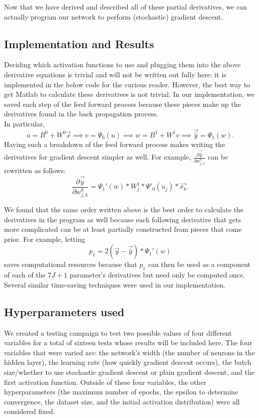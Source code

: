 \documentclass[reqno,14pt]{amsart}
\theoremstyle{plain}
\theoremstyle{definition}
\theoremstyle{remark}
\begin{document}
Now that we have derived and described all of these partial derivatives, we can actually program our network to perform (stochastic) gradient descent.\\

\subsection{Implementation and Results}
Deciding which activation functions to use and plugging them into the above derivative equations is trivial and will not be written out fully here: it is implemented in the below code for the curious reader. However, the best way to get Matlab to calculate these derivatives is not trivial. In our implementation, we saved each step of the feed forward process because these pieces make up the derivatives found in the back propagation process.\\
In particular, 
\begin{equation}
    u = B^0 + W^0 \overrightarrow{x} \implies  v  = \Psi_0(u) \implies w = B^1 + W^1 v \implies \overrightarrow{\hat{y}} = \Psi_1(w).
\end{equation}
Having such a breakdown of the feed forward process makes writing the derivatives for gradient descent simpler as well. For example, $\frac{\partial \overrightarrow{\hat{y}}}{\partial w^0_{j,k}}$ can be rewritten as follows:
\begin{equation}
    \frac{\partial \overrightarrow{\hat{y}}}{\partial w^0_{j,k}} = \Psi_1'(w) * W^1_j * \Psi'_0(u_j) * \overrightarrow{x_k}.
\end{equation}

We found that the same order written above is the best order to calculate the derivatives in the program as well because each following derivative that gets more complicated can be at least partially constructed from pieces that come prior. For example, letting
\begin{equation}
    p_1 = 2(\overrightarrow{y} - \overrightarrow{\hat{y}}) * \Psi_1'(w)
\end{equation}
saves computational resources because that $p_1$ can then be used as a component of each of the $7J+1$ parameter's derivatives but need only be computed once. Several similar time-saving techniques were used in our implementation.\\

\subsection{Hyperparameters used}
We created a testing campaign to test two possible values of four different variables for a total of sixteen tests whose results will be included here. The four variables that were varied are: the network's width (the number of neurons in the hidden layer), the learning rate (how quickly gradient descent occurs), the batch size/whether to use stochastic gradient descent or plain gradient descent, and the first activation function. Outside of these four variables, the other hyperparameters (the maximum number of epochs, the epsilon to determine convergence, the dataset size, and the initial activation distribution) were all considered fixed.\\
\end{document}
